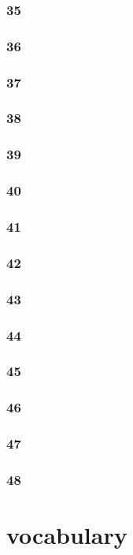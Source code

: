 \documentclass[12pt,twiside,a4paper]{ctexbook}
\numberwithin{chapter}{part}
\begin{document}
\subsection{35}
\subsection{36}
\subsection{37}
\subsection{38}
\subsection{39}
\subsection{40}
\subsection{41}
\subsection{42}
\subsection{43}
\subsection{44}
\subsection{45}
\subsection{46}
\subsection{47}
\subsection{48}

\chapter{vocabulary}
\end{document}
